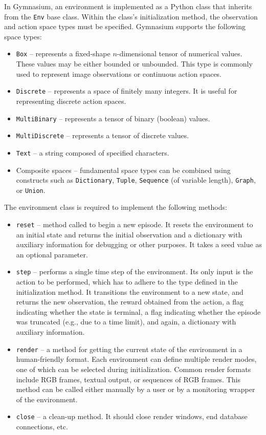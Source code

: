 \documentclass[
  digital,     %
  oneside,     %
  nosansbold,  %
  nocolorbold, %
  lof,         %
  lot,         %
]{fithesis4}
\begin{document}
In Gymnasium, an environment is implemented as a Python class that inherits from the \texttt{Env} base class. Within the class's initialization method, the observation and action space types must be specified. Gymnasium supports the following space types:

\begin{itemize}
    \item \texttt{Box} -- represents a fixed-shape $n$-dimensional tensor of numerical values. These values may be either bounded or unbounded. This type is commonly used to represent image observations or continuous action spaces.
    \item \texttt{Discrete} -- represents a space of finitely many integers. It is useful for representing discrete action spaces.
    \item \texttt{MultiBinary} -- represents a tensor of binary (boolean) values.
    \item \texttt{MultiDiscrete} -- represents a tensor of discrete values.
    \item \texttt{Text} -- a string composed of specified characters.
    \item Composite spaces -- fundamental space types can be combined using constructs such as \texttt{Dictionary}, \texttt{Tuple}, \texttt{Sequence} (of variable length), \texttt{Graph}, or \texttt{Union}.
\end{itemize}

The environment class is required to implement the following methods:

\begin{itemize}
    \item \texttt{reset} -- method called to begin a new episode. It resets the environment to an initial state and returns the initial observation and a dictionary with auxiliary information for debugging or other purposes. It takes a seed value as an optional parameter.
    \item \texttt{step} -- performs a single time step of the environment. Its only input is the action to be performed, which has to adhere to the type defined in the initialization method. It transitions the environment to a new state, and returns the new observation, the reward obtained from the action, a flag indicating whether the state is terminal, a flag indicating whether the episode was truncated (e.g., due to a time limit), and again, a dictionary with auxiliary information.
    \item \texttt{render} -- a method for getting the current state of the environment in a human-friendly format. Each environment can define multiple render modes, one of which can be selected during initialization. Common render formats include RGB frames, textual output, or sequences of RGB frames. This method can be called either manually by a user or by a monitoring wrapper of the environment.
    \item \texttt{close} -- a clean-up method. It should close render windows, end database connections, etc.
\end{itemize}
\end{document}
